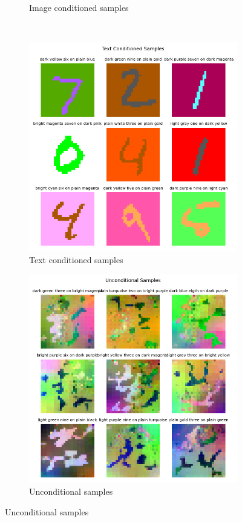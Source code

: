 \documentclass{article}
\begin{document}
\begin{enumerate}[(a)]
\begin{figure}[H]
\begin{subfigure}{0.45\textwidth}
        \caption{Image conditioned samples}
    \end{subfigure} \\
    \begin{subfigure}{0.45\textwidth}
        \centering
        \includegraphics[width=\textwidth]{figures/q6_a_samples_text_conditioned.png}
        \caption{Text conditioned samples}
    \end{subfigure}
    \hspace{0.2in}
    \begin{subfigure}{0.45\textwidth}
        \centering
        \includegraphics[width=\textwidth]{figures/q6_a_samples_unconditional.png}
        \caption{Unconditional samples}
    \end{subfigure}
\end{figure}

\end{enumerate}
\end{document}
